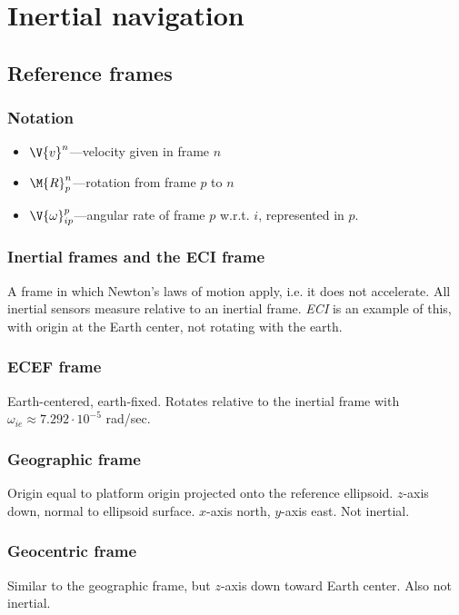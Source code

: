 \section{Inertial navigation}

\subsection{Reference frames}

\subsubsection{Notation}
\begin{itemize}
	\item $\V{v}^n$---velocity given in frame $n$
	\item $\M{R}_p^n$---rotation from frame $p$ to $n$
	\item $\V{\omega}_{ip}^p$---angular rate of frame $p$ w.r.t. $i$, represented in $p$.
\end{itemize}

\subsubsection{Inertial frames and the ECI frame}
A frame in which Newton's laws of motion apply, i.e. it does not accelerate. All inertial sensors measure relative to an inertial frame. \emph{ECI} is an example of this, with origin at the Earth center, not rotating with the earth.

\subsubsection{ECEF frame}
Earth-centered, earth-fixed. Rotates relative to the inertial frame with $\omega_{ie} \approx 7.292 \cdot 10^{-5}$ rad/sec.

\subsubsection{Geographic frame}
Origin equal to platform origin projected onto the reference ellipsoid. $z$-axis down, normal to ellipsoid surface. $x$-axis north, $y$-axis east. Not inertial.

\subsubsection{Geocentric frame}
Similar to the geographic frame, but $z$-axis down toward Earth center. Also not inertial.

